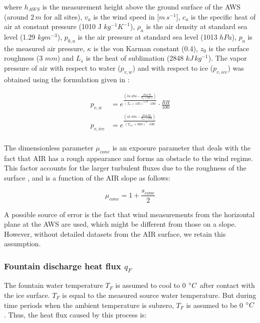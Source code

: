 where $h_{AWS}$ is the measurement height above the ground surface of the AWS (around $2\,m$ for all sites),
$v_a$ is the wind speed in [$m\,s^{-1}$], $c_a$ is the specific heat of air at constant pressure (1010 J
$kg^{-1} K^{-1}$), $\rho_{a}$ is the air density at standard sea level (1.29 $kg m^{-3}$), $p_{0,a}$ is the air
pressure at standard sea level (1013 $hPa$), $p_{a}$ is the measured air pressure, $\kappa$ is the von Karman
constant (0.4), $z_{0}$ is the surface roughness (3 $mm$) and $L_s$ is the heat of sublimation (2848
$kJ\,kg^{-1}$).  The vapor pressure of air with respect to water ($p_{v,w}$) and with respect to ice
($p_{v,ice}$) was obtained using the formulation given in \cite{huangSimpleAccurateFormula2018} :

\begin{equation}
	\begin{split}
		p_{v,w}&=e^{\frac{(34.494 - \frac{4924.99}{T_{a} + 237.1})}{(T_a + 105)^{1.57} \cdot 100}} \cdot \frac{RH}{100} \\
		p_{v,ice}&=e^{\frac{(43.494 - \frac{6545.89}{T_{ice} + 278})}{(T_{ice} + 868)^{2} \cdot 100}} \\
	\end{split} \label{eqn:vp}
\end{equation}

The dimensionless parameter $\mu_{cone}$ is an exposure parameter that deals with the fact that AIR has a rough
appearance and forms an obstacle to the wind regime. This factor accounts for the larger turbulent fluxes due to
the roughness of the surface \citep{oerlemansBriefCommunicationGrowth2021}, and is a function of the AIR slope
as follows:

\begin{equation}
	\mu_{cone} = 1 + \frac{s_{cone}}{2}
\end{equation}

A possible source of error is the fact that wind measurements from the horizontal plane at the AWS are used,
which might be different from those on a slope. However, without detailed datasets from the AIR surface, we
retain this assumption.

\subsubsection{Fountain discharge heat flux \texorpdfstring{$q_{F}$}{Lg} } \label{sec:heatflux}

The fountain water temperature $T_F$ is assumed to cool to 0 $^{\circ} C$ after contact with the ice surface.
$T_F$ is equal to the measured source water temperature. But during time periods when the ambient temperature is
subzero, $T_F$ is assumed to be 0 $^{\circ} C$. Thus, the heat flux caused by this process is:

